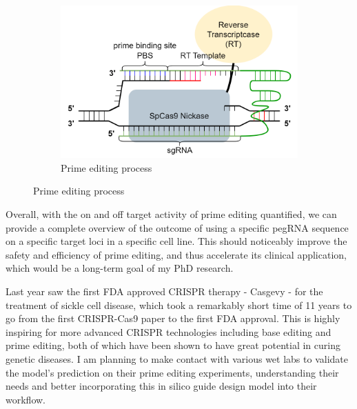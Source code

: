 \documentclass[a4,12pt]{article}
\begin{document}
\begin{figure}
    \centering
    \begin{subfigure}{0.5\textwidth}
        \includegraphics[width=\textwidth]{prime-editing-process.png}
        \caption{Prime editing process}
        \label{fig:prime-editing-process}
    \end{subfigure}
\end{figure}

Overall, with the on and off target activity of prime editing quantified, we can provide a complete overview of the outcome of using a specific pegRNA sequence on a specific target loci in a specific cell line. This should noticeably improve the safety and efficiency of prime editing, and thus accelerate its clinical application, which would be a long-term goal of my PhD research. 

Last year saw the first FDA approved CRISPR therapy - Casgevy - for the treatment of sickle cell disease, which took a remarkably short time of 11 years to go from the first CRISPR-Cas9 paper to the first FDA approval\cite{CRISPRClinicalTrials}. This is highly inspiring for more advanced CRISPR technologies including base editing and prime editing, both of which have been shown to have great potential in curing genetic diseases. I am planning to make contact with various wet labs to validate the model's prediction on their prime editing experiments, understanding their needs and better incorporating this in silico guide design model into their workflow. 

\printbibliography
\end{document}
